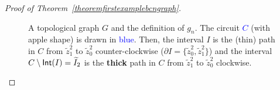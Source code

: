 \documentclass[a4paper, 11pt]{amsart}
\numberwithin{equation}{section}
\theoremstyle{customnumberedtheorem}
\theoremstyle{definitionwithbfnote}
\DeclareMathOperator{\Int}{\textsf{\upshape Int}}
\begin{document}
\begin{proof}[Proof of Theorem~\ref{theoremfirstexamplebcngraph}]
\begin{figure}[t]
\caption{A topological graph $G$ and the definition of $g_n$.
         The circuit \textcolor{blue}{$C$} (with apple shape) is drawn in \textcolor{blue}{blue}.
         Then, the interval $I$ is the (thin) path in $C$ from $\tilde{z}^2_1$ to $\tilde{z}^2_0$ counter-clockwise
         ($\partial{}I = \{\tilde{z}^2_0,\tilde{z}^2_1\}$)
         and the interval $C\setminus\Int(I) = \widetilde{I}_2$ is
         the \textbf{thick} path
         in $C$ from $\tilde{z}^2_1$ to $\tilde{z}^2_0$ clockwise.}\label{figuregraphGandmapgnfirstexampleBCN}
\end{figure}


\end{proof}
\end{document}
